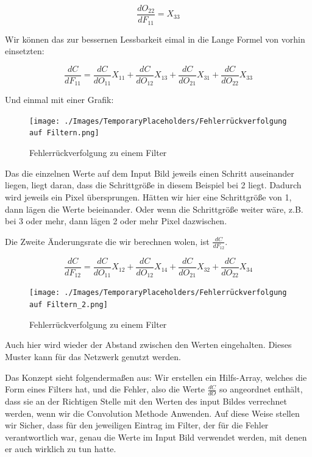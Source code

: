 \documentclass[12pt]{article}
\begin{document}
$$\frac{dO_{22}} {dF_{11}} = X_{33}$$

Wir können das zur bessernen Lessbarkeit eimal in die Lange Formel von vorhin einsetzten:

$$
\frac{dC}{dF_{11}} = 
\frac{dC} {dO_{11}} X_{11}+
\frac{dC} {dO_{12}} X_{13}+
\frac{dC} {dO_{21}} X_{31}+
\frac{dC} {dO_{22}} X_{33}
$$

Und einmal mit einer Grafik:

\begin{figure}[H]
\centering
\texttt{[image: ./Images/TemporaryPlaceholders/Fehlerrückverfolgung auf Filtern.png]}
\caption{Fehlerrückverfolgung zu einem Filter}
\label{Fehlerrückverfolgung zu einem Filter v1}
\end{figure}

Das die einzelnen Werte auf dem Input Bild jeweils einen Schritt auseinander liegen, liegt daran, dass die Schrittgröße in diesem Beispiel bei 2 liegt. Dadurch wird jeweils ein Pixel übersprungen. Hätten wir hier eine Schrittgröße von 1, dann lägen die Werte beieinander. Oder wenn die Schrittgröße weiter wäre, z.B. bei 3 oder mehr, dann lägen 2 oder mehr Pixel dazwischen.

Die Zweite Änderungsrate die wir berechnen wolen, ist $\frac{dC}{dF_{12}}$. 


$$
\frac{dC}{dF_{12}} = 
\frac{dC} {dO_{11}} X_{12}+
\frac{dC} {dO_{12}} X_{14}+
\frac{dC} {dO_{21}} X_{32}+
\frac{dC} {dO_{22}} X_{34}
$$

\begin{figure}[H]
\centering
\texttt{[image: ./Images/TemporaryPlaceholders/Fehlerrückverfolgung auf Filtern\_2.png]}
\caption{Fehlerrückverfolgung zu einem Filter}
\label{Fehlerrückverfolgung zu einem Filter v2}
\end{figure}

Auch hier wird wieder der Abstand zwischen den Werten eingehalten. Dieses Muster kann für das Netzwerk genutzt werden. 

Das Konzept sieht folgendermaßen aus: Wir erstellen ein Hilfs-Array, welches die Form eines Filters hat, und die Fehler, also die Werte $\frac{dC} {dO}$ so angeordnet enthält, dass sie an der Richtigen Stelle mit den Werten des input Bildes verrechnet werden, wenn wir die Convolution Methode Anwenden. Auf diese Weise stellen wir Sicher, dass für den jeweiligen Eintrag im Filter, der für die Fehler verantwortlich war, genau die Werte im Input Bild verwendet werden, mit denen er auch wirklich zu tun hatte.
\end{document}
